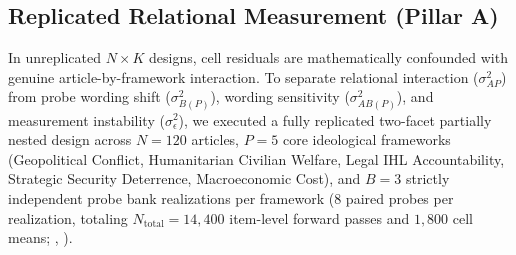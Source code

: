 \subsection{Replicated Relational Measurement (Pillar A)}
\label{sec:replicated_relational_measurement}

In unreplicated $N \times K$ designs, cell residuals are mathematically confounded with genuine article-by-framework interaction. To separate relational interaction ($\sigma^2_{AP}$) from probe wording shift ($\sigma^2_{B(P)}$), wording sensitivity ($\sigma^2_{AB(P)}$), and measurement instability ($\sigma^2_\epsilon$), we executed a fully replicated two-facet partially nested design across $N = 120$ articles, $P = 5$ core ideological frameworks (Geopolitical Conflict, Humanitarian Civilian Welfare, Legal IHL Accountability, Strategic Security Deterrence, Macroeconomic Cost), and $B = 3$ strictly independent probe bank realizations per framework (8 paired probes per realization, totaling $N_{\text{total}} = 14{,}400$ item-level forward passes and $1{,}800$ cell means; , ).

